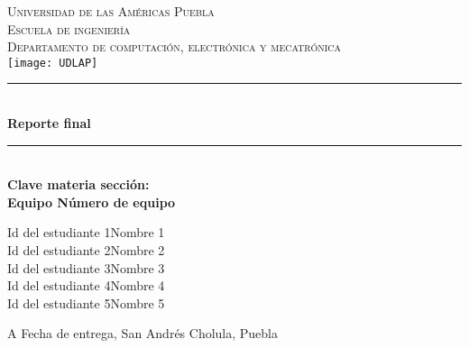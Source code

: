 \documentclass[12pt]{article}  %
\def\titulo{Reporte final}%
\def\materia{Clave materia sección: } %
\def\fecha{Fecha de entrega} %
\def\equipo {Número de equipo}%
\def\ida{Id del estudiante 1} %
\def\esta{Nombre 1}
\def\idb{Id del estudiante 2}
\def\estb{Nombre 2}
\def\idc{Id del estudiante 3}
\def\estc{Nombre 3}
\def\idd{Id del estudiante 4}
\def\estd{Nombre 4}
\def\ide{Id del estudiante 5}
\def\este{Nombre 5}%
\begin{document}
\begin{center}														
\newcommand{\HRule}{\rule{\linewidth}{0.5mm}}						
\thispagestyle{empty} 												
\vspace*{-1.5cm}								
\textsc{\huge Universidad de las Américas Puebla}\\[1.5cm]	
\textsc{\LARGE Escuela de ingeniería}\\[1.5cm]	
\textsc{\LARGE Departamento de computación, electrónica y mecatrónica}\\[1.5cm]												
\texttt{[image: UDLAP]}  									\vspace*{1cm}														\HRule \\[0.4cm]												
{ \huge \bfseries \titulo}\\[0.4cm]	
\HRule \\[1cm]														
{ \Large \bfseries \materia}\\[1cm] 	
{ \Large \bfseries Equipo \equipo}\\[1cm] 							
\begin{flushleft} \Large											
\ida \hspace{0.5cm}\esta \\
\idb \hspace{0.5cm}\estb \\
\idc \hspace{0.5cm}\estc \\
\idd \hspace{0.5cm}\estd \\
\ide \hspace{0.5cm}\este \\ %
\end{flushleft}														
\vfill																
\begin{center}													
{\Large A \fecha, San Andrés Cholula, Puebla}						
\end{center}												 		
\end{center}							 								\newpage						
\end{document}
